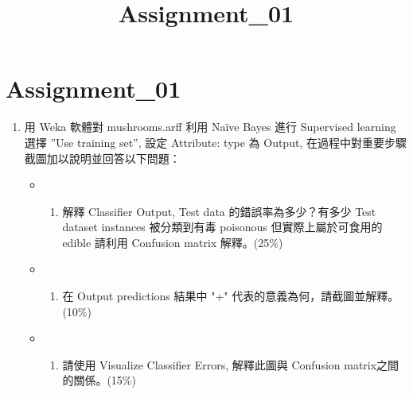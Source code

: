 \documentclass[11pt]{article}
\title{Assignment\_01}
\providecommand{\tightlist}{%
      \setlength{\itemsep}{0pt}\setlength{\parskip}{0pt}}
\begin{document}
    
    
    \maketitle
    
    

    
    \section{Assignment\_01}\label{assignment_01}

\begin{enumerate}
\def\labelenumi{\arabic{enumi}.}
\item
  用 Weka 軟體對 mushrooms.arff 利用 Naïve Bayes 進行 Supervised
  learning 選擇 ''Use training set'', 設定 Attribute: type 為 Output,
  在過程中對重要步驟截圖加以說明並回答以下問題：

  \begin{itemize}
  \item
    \begin{enumerate}
    \def\labelenumii{(\alph{enumii})}
    \tightlist
    \item
      解釋 Classifier Output, Test data 的錯誤率為多少？有多少 Test
      dataset instances 被分類到有毒 poisonous 但實際上屬於可食用的
      edible 請利用 Confusion matrix 解釋。(25\%)
    \end{enumerate}
  \item
    \begin{enumerate}
    \def\labelenumii{(\alph{enumii})}
    \setcounter{enumii}{1}
    \tightlist
    \item
      在 Output predictions 結果中 "+"
      代表的意義為何，請截圖並解釋。(10\%)
    \end{enumerate}
  \item
    \begin{enumerate}
    \def\labelenumii{(\alph{enumii})}
    \setcounter{enumii}{2}
    \tightlist
    \item
      請使用 Visualize Classifier Errors, 解釋此圖與 Confusion
      matrix之間的關係。(15\%)
    \end{enumerate}
  \end{itemize}
\end{enumerate}
\end{document}
